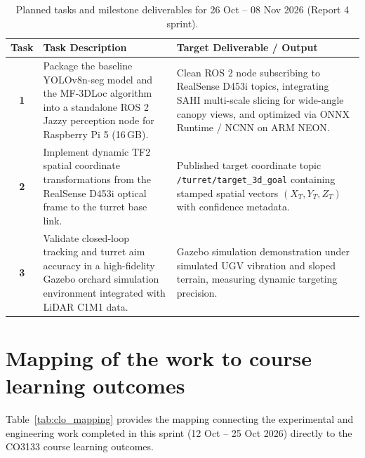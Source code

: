 \documentclass[12pt,a4paper]{article}
\begin{document}
\begin{table}[htbp]
\centering
\small
\caption{Planned tasks and milestone deliverables for 26 Oct -- 08 Nov 2026 (Report 4 sprint).}
\label{tab:plan}
\begin{tabularx}{\textwidth}{c p{7.0cm} X}
\toprule
\textbf{Task} & \textbf{Task Description} & \textbf{Target Deliverable / Output} \\
\midrule
\textbf{1} & Package the baseline YOLOv8n-seg model and the MF-3DLoc algorithm into a standalone ROS 2 Jazzy perception node for Raspberry Pi 5 (16\,GB). & Clean ROS 2 node subscribing to RealSense D453i topics, integrating SAHI multi-scale slicing for wide-angle canopy views, and optimized via ONNX Runtime / NCNN on ARM NEON. \\
\addlinespace
\textbf{2} & Implement dynamic TF2 spatial coordinate transformations from the RealSense D453i optical frame to the turret base link. & Published target coordinate topic \texttt{/turret/target\_3d\_goal} containing stamped spatial vectors $(X_T, Y_T, Z_T)$ with confidence metadata. \\
\addlinespace
\textbf{3} & Validate closed-loop tracking and turret aim accuracy in a high-fidelity Gazebo orchard simulation environment integrated with LiDAR C1M1 data. & Gazebo simulation demonstration under simulated UGV vibration and sloped terrain, measuring dynamic targeting precision. \\
\bottomrule
\end{tabularx}
\end{table}

\section{Mapping of the work to course learning outcomes}

Table~\ref{tab:clo_mapping} provides the mapping connecting the experimental and engineering work completed in this sprint (12 Oct -- 25 Oct 2026) directly to the CO3133 course learning outcomes.
\end{document}
